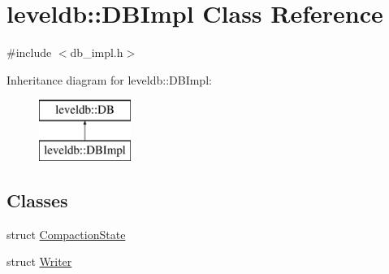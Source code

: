 \hypertarget{classleveldb_1_1_d_b_impl}{}\section{leveldb\+:\+:D\+B\+Impl Class Reference}
\label{classleveldb_1_1_d_b_impl}


{\ttfamily \#include $<$db\+\_\+impl.\+h$>$}

Inheritance diagram for leveldb\+:\+:D\+B\+Impl\+:\begin{figure}[H]
\begin{center}
\leavevmode
\includegraphics[height=2.000000cm]{classleveldb_1_1_d_b_impl}
\end{center}
\end{figure}
\subsection*{Classes}
\begin{DoxyCompactItemize}
\item 
struct \hyperlink{structleveldb_1_1_d_b_impl_1_1_compaction_state}{Compaction\+State}
\item 
struct \hyperlink{structleveldb_1_1_d_b_impl_1_1_writer}{Writer}
\end{DoxyCompactItemize}
